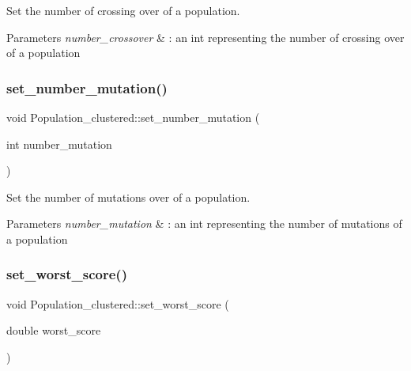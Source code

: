 Set the number of crossing over of a population. 


\begin{DoxyParams}{Parameters}
{\em number\+\_\+crossover} & \+: an int representing the number of crossing over of a population \\
\hline
\end{DoxyParams}
\mbox{\label{class_population__clustered_ab9e60e2a8ae0388db9de7ea071687c9e}} 
\subsubsection{\texorpdfstring{set\+\_\+number\+\_\+mutation()}{set\_number\_mutation()}}
{\footnotesize\ttfamily void Population\+\_\+clustered\+::set\+\_\+number\+\_\+mutation (\begin{DoxyParamCaption}\item[{int}]{number\+\_\+mutation }\end{DoxyParamCaption})}



Set the number of mutations over of a population. 


\begin{DoxyParams}{Parameters}
{\em number\+\_\+mutation} & \+: an int representing the number of mutations of a population \\
\hline
\end{DoxyParams}
\mbox{\label{class_population__clustered_a30378ce62362cd7ec929af2e66018a98}} 
\subsubsection{\texorpdfstring{set\+\_\+worst\+\_\+score()}{set\_worst\_score()}}
{\footnotesize\ttfamily void Population\+\_\+clustered\+::set\+\_\+worst\+\_\+score (\begin{DoxyParamCaption}\item[{double}]{worst\+\_\+score }\end{DoxyParamCaption})}



